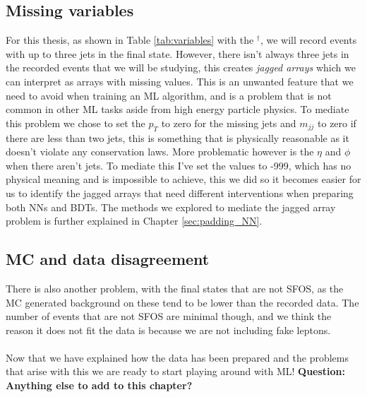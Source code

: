 \documentclass[12pt, a4paper]{book}
\begin{document}
\subsection{Missing variables}\label{sec:jagged_arrays}
For this thesis, as shown in Table \ref{tab:variables} with the $^\dagger$, we will record events with up to three jets in the final state. However, there isn't always three jets in the recorded events that we will be studying, 
this creates \textit{jagged arrays} which we can interpret as arrays with missing values. This is an unwanted feature that we need to avoid when training an ML algorithm, and is a problem that is not common in other ML tasks aside from high energy particle physics.
To mediate this problem we chose to set the $p_T$ to zero for the missing jets and $m_{jj}$ to zero if there are less than two jets, this is something that is physically reasonable as it doesn't violate any conservation laws. 
More problematic however is the $\eta$ and $\phi$ when there aren't jets. To mediate this I've set the values to -999, which has no physical meaning and is impossible to achieve, this we did so it becomes easier for us to identify the jagged arrays that 
need different interventions when preparing both NNs and BDTs. The methods we explored to mediate the jagged array problem is further explained in Chapter \ref{sec:padding_NN}. 

\subsection{MC and data disagreement} 
There is also another problem, with the final states that are not SFOS, as the MC generated background 
on these tend to be lower than the recorded data. The number of events that are not SFOS are minimal though, and we think the reason it does not fit the data is because we are not including fake leptons. \\
\\Now that we have explained how the data has been prepared and the problems that arise with this we are ready to start playing around with ML!
\textbf{Question: Anything else to add to this chapter?}
\end{document}
